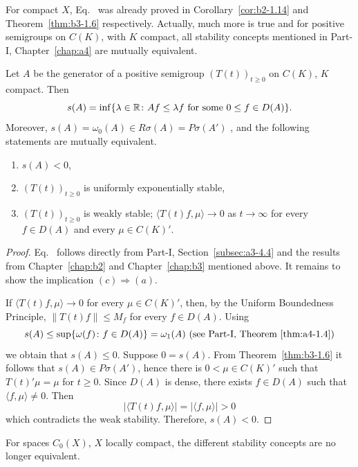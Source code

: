 For compact $X$, Eq.~ was already proved in Corollary~\ref{cor:b2-1.14} and Theorem~\ref{thm:b3-1.6} respectively. 
Actually, much more is true and for positive semigroups on $C(K)$, with $K$ compact, all stability concepts mentioned in Part-I, Chapter~\ref{chap:a4} are mutually equivalent.
\begin{theorem}\label{thm:b4-1.1}%
Let $A$ be the generator of a positive semigroup $(T(t))_{t \geq 0}$ on $C(K)$, $K$ compact. Then
\begin{equation}\label{eq:b4-1.2}
   s(A) = \inf \{\lambda \in \R \colon Af \leq \lambda f \text{ for some } 0 \leq f \in D(A)\} .
\end{equation}
Moreover, $s(A) = \omega_{0}(A) \in R\sigma(A) = P\sigma(A')$ , and the following statements are mutually equivalent.
\begin{enumerate}[\upshape (a)]
\item $s(A) < 0$,
\item $(T(t))_{t \geq 0}$ is uniformly exponentially stable,
\item $(T(t))_{t \geq 0}$ is weakly stable; \ie $\langle T(t)f,\mu \rangle \to 0$ as $t \to \infty$ for every $f \in D(A)$ and every $\mu \in C(K)'$.
\end{enumerate}
\end{theorem}
\begin{proof}
Eq.~ follows directly from Part-I, Section~\ref{subsec:a3-4.4} and the results from Chapter~\ref{chap:b2} and Chapter~\ref{chap:b3} mentioned above. 
It remains to show the implication $(c) \Rightarrow (a)$.

If\/ $\langle T(t)f,\mu \rangle \to 0$ for every $\mu \in C(K)'$, then, by the Uniform Boundedness Principle, $\|T(t)f\| \leq M_f$ for every $f \in D(A)$. 
Using 
\[
s(A) \leq \sup \{\omega(f)\colon f \in D(A)\} = \omega_1(A)
\text{ (see Part-I, Theorem~\ref{thm:a4-1.4})}
\]
we obtain that $s(A) \leq 0$. 
Suppose $0 = s(A)$. 
From Theorem~\ref{thm:b3-1.6} it follows that $s(A) \in P\sigma(A')$, hence there is $0 < \mu \in C(K)'$ such that $T(t)'\mu = \mu$ for $t \geq 0$. 
Since $D(A)$ is dense, there exists $f \in D(A)$ such that $\langle f,\mu \rangle \neq 0$. 
Then 
\[
|\langle T(t)f,\mu \rangle| = |\langle f,\mu \rangle|   >  0
\]
which contradicts the weak stability. Therefore, $s(A) < 0$.
\end{proof}
For spaces $C_{0}(X)$, $X$ locally compact, the different stability concepts are no longer equivalent.
